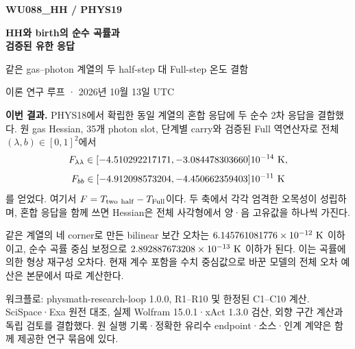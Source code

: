 

\begin{titlepage}
\vspace*{14mm}
{\sffamily\bfseries\color{MidnightBlue}\Large WU088\_HH / PHYS19\par}
\vspace{8mm}
{\huge\bfseries HH와 birth의 순수 곡률과\\[3mm]검증된 유한 응답\par}
\vspace{7mm}
{\large 같은 gas--photon 계열의 두 half-step 대 Full-step 온도 결함\par}
\vspace{10mm}
{\large 이론 연구 루프 · 2026년 10월 13일 UTC\par}
\vspace{12mm}
\noindent\textbf{이번 결과.}
PHYS18에서 확립한 동일 계열의 혼합 응답에 두 순수 2차 응답을 결합했다.
원 gas Hessian, 35개 photon slot, 단계별 carry와 검증된 Full 역연산자로
전체 $(\lambda,b)\in[0,1]^2$에서
\[
F_{\lambda\lambda}\in[-4.510292217171,-3.084478303660]10^{-14}\ {\rm K},
\]
\[
F_{bb}\in[-4.912098573204,-4.450662359403]10^{-11}\ {\rm K}
\]
를 얻었다. 여기서 $F=T_{\rm two\ half}-T_{\rm Full}$이다.
두 축에서 각각 엄격한 오목성이 성립하며, 혼합 응답을 함께 쓰면
Hessian은 전체 사각형에서 양·음 고유값을 하나씩 가진다.

\vspace{4mm}
\noindent 같은 계열의 네 corner로 만든 bilinear 보간 오차는
$6.145761081776\times10^{-12}\ {\rm K}$ 이하이고,
순수 곡률 중심 보정으로
$2.892887673208\times10^{-13}\ {\rm K}$ 이하가 된다.
이는 곡률에 의한 형상 재구성 오차다. 현재 계수 포함을 수치 중심값으로
바꾼 모델의 전체 오차 예산은 본문에서 따로 계산한다.

\vfill
\noindent\small
워크플로: physmath-research-loop 1.0.0, R1--R10 및 한정된 C1--C10 계산.
SciSpace·Exa 원전 대조, 실제 Wolfram 15.0.1·xAct 1.3.0 검산,
외향 구간 계산과 독립 검토를 결합했다.
원 실행 기록·정확한 유리수 endpoint·소스·인계 계약은 함께 제공한 연구 묶음에 있다.
\end{titlepage}

